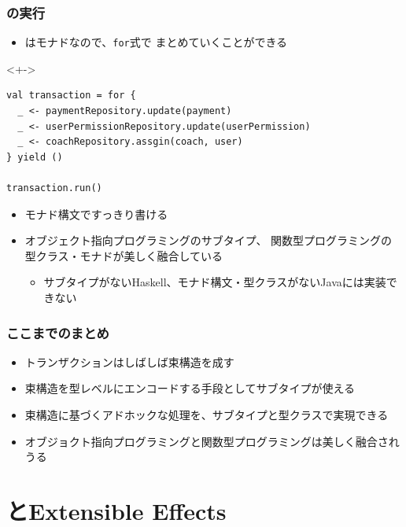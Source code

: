 \begin{frame}[fragile]
  \frametitle{\Fujitask の実行}

  \begin{itemize}
    \item<+-> \Fujitask はモナドなので、\lstinline|for|式で
    まとめていくことができる
  \end{itemize}

  \begin{uncoverenv}<+->
\begin{lstlisting}[style=scala]
val transaction = for {
  _ <- paymentRepository.update(payment)
  _ <- userPermissionRepository.update(userPermission)
  _ <- coachRepository.assgin(coach, user)
} yield ()

transaction.run()
\end{lstlisting}
  \end{uncoverenv}

  \begin{itemize}
    \item<+-> モナド構文ですっきり書ける

    \item<+-> オブジェクト指向プログラミングのサブタイプ、
    関数型プログラミングの型クラス・モナドが美しく融合している
    \begin{itemize}
      \item サブタイプがないHaskell、モナド構文・型クラスがないJavaに\Fujitask は実装できない
    \end{itemize}
  \end{itemize}
\end{frame}


\begin{frame}
  \frametitle{ここまでのまとめ}

  \pause
  \begin{itemize}
    \item<+-> トランザクションはしばしば束構造を成す
    \item<+-> 束構造を型レベルにエンコードする手段としてサブタイプが使える
    \item<+-> 束構造に基づくアドホックな処理を、サブタイプと型クラスで実現できる
    \item<+-> オブジョクト指向プログラミングと関数型プログラミングは美しく融合されうる
  \end{itemize}
\end{frame}

\section{\Fujitask とExtensible Effects}

